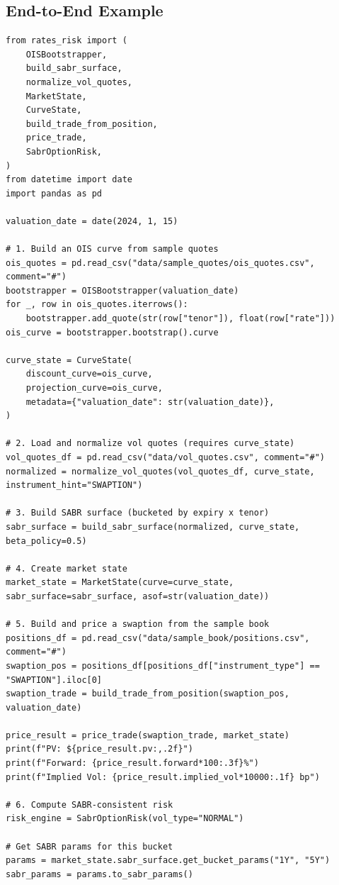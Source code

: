 \documentclass[12pt,a4paper]{report}
\begin{document}
\subsection{End-to-End Example}

\begin{lstlisting}
from rates_risk import (
    OISBootstrapper,
    build_sabr_surface,
    normalize_vol_quotes,
    MarketState,
    CurveState,
    build_trade_from_position,
    price_trade,
    SabrOptionRisk,
)
from datetime import date
import pandas as pd

valuation_date = date(2024, 1, 15)

# 1. Build an OIS curve from sample quotes
ois_quotes = pd.read_csv("data/sample_quotes/ois_quotes.csv", comment="#")
bootstrapper = OISBootstrapper(valuation_date)
for _, row in ois_quotes.iterrows():
    bootstrapper.add_quote(str(row["tenor"]), float(row["rate"]))
ois_curve = bootstrapper.bootstrap().curve

curve_state = CurveState(
    discount_curve=ois_curve,
    projection_curve=ois_curve,
    metadata={"valuation_date": str(valuation_date)},
)

# 2. Load and normalize vol quotes (requires curve_state)
vol_quotes_df = pd.read_csv("data/vol_quotes.csv", comment="#")
normalized = normalize_vol_quotes(vol_quotes_df, curve_state, instrument_hint="SWAPTION")

# 3. Build SABR surface (bucketed by expiry x tenor)
sabr_surface = build_sabr_surface(normalized, curve_state, beta_policy=0.5)

# 4. Create market state
market_state = MarketState(curve=curve_state, sabr_surface=sabr_surface, asof=str(valuation_date))

# 5. Build and price a swaption from the sample book
positions_df = pd.read_csv("data/sample_book/positions.csv", comment="#")
swaption_pos = positions_df[positions_df["instrument_type"] == "SWAPTION"].iloc[0]
swaption_trade = build_trade_from_position(swaption_pos, valuation_date)

price_result = price_trade(swaption_trade, market_state)
print(f"PV: ${price_result.pv:,.2f}")
print(f"Forward: {price_result.forward*100:.3f}%")
print(f"Implied Vol: {price_result.implied_vol*10000:.1f} bp")

# 6. Compute SABR-consistent risk
risk_engine = SabrOptionRisk(vol_type="NORMAL")

# Get SABR params for this bucket
params = market_state.sabr_surface.get_bucket_params("1Y", "5Y")
sabr_params = params.to_sabr_params()


\end{lstlisting}
\end{document}
